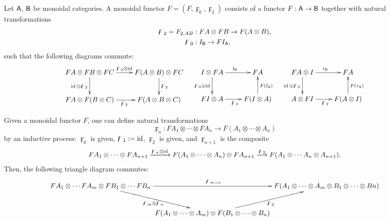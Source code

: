 Let $\mathsf{A}$, $\mathsf{B}$ be monoidal categories. A monoidal functor $F = (F,
\digamma_0, \digamma_2)$ consists of a functor $F: \mathsf{A} \to \mathsf{B}$ together with natural
transformations
\begin{align*}
  \digamma_2 = F_{2, AB} &: FA \otimes FB \to F(A\otimes B),
  \\
  \digamma_0 &: I_{\mathsf{B}} \to FI_{\mathsf{A}},
\end{align*}
such that the following diagrams commute:
\begin{equation*}
  \xymatrix{%
    FA \otimes FB \otimes FC
    &
    F(A\otimes B) \otimes FC
    \\
    FA \otimes F(B\otimes C)
    &
    F(A\otimes B\otimes C)
    \ar "1,1";"1,2" ^{\digamma_2 \otimes \id}
    \ar "2,1";"2,2" _{\digamma_2}
    \ar "1,1";"2,1" _{\id \otimes \digamma_2}
    \ar "1,2";"2,2" ^{\digamma_2}
    }
  \quad
  \xymatrix{%
    I \otimes FA
    &
    FA
    \\
    FI \otimes A
    &
    F(I\otimes A)
    \ar "1,1";"1,2" ^{l_\B}
    \ar "2,1";"2,2" _{\digamma_2}
    \ar "1,1";"2,1" _{\digamma_0 \otimes \id}
    \ar "2,2";"1,2" _{F(l_\A)}
    }
  \quad
    \xymatrix{%
    FA \otimes I
    &
    FA
    \\
    A \otimes FI
    &
    F(A\otimes I)
    \ar "1,1";"1,2" ^{r_\B}
    \ar "2,1";"2,2" _{\digamma_2}
    \ar "1,1";"2,1" _{\id \otimes \digamma_0}
    \ar "2,2";"1,2" _{F(r_\A)}
    }
\end{equation*}

Given a monoidal functor $F$, one can define natural transformations
\cite{joyal-street;btc} 
\begin{equation*}
  \digamma_n : FA_1 \otimes \cdots \otimes FA_n \to F(A_1 \otimes \cdots \otimes A_n)
\end{equation*}
by an inductive process: $\digamma_0$ is given, $\digamma_1 := \operatorname{id}$, $\digamma_2$ is
given, and $\digamma_{n+1}$ is the composite
\begin{equation*}
    FA_1 \otimes \cdots \otimes FA_{n+1}
    \xrightarrow{\digamma_n \otimes \operatorname{id}}
    F(A_1 \otimes \cdots \otimes A_n) \otimes FA_{n+1} 
    \stackrel{\digamma_2}\longrightarrow
    F(A_1 \otimes \cdots A_n \otimes A_{n+1}).
\end{equation*}
Then, the following triangle diagram commutes:
\begin{equation*}
  \xymatrix@C0pt{%
    FA_1 \otimes \cdots FA_m \otimes FB_1 \otimes \cdots FB_n 
    &
    &
    F(A_1 \otimes \cdots \otimes A_m \otimes B_1 \otimes \cdots \otimes Bn)
    \\
    &
    F(A_1 \otimes \cdots \otimes A_m) \otimes F(B_1 \otimes \cdots \otimes B_n)
    &
    \ar "1,1";"1,3" ^{\digamma_{m+n}}
    \ar "1,1";"2,2" _{\digamma_m \otimes \digamma_n}
    \ar "2,2";"1,3" _{\digamma_2}
    }
\end{equation*}


